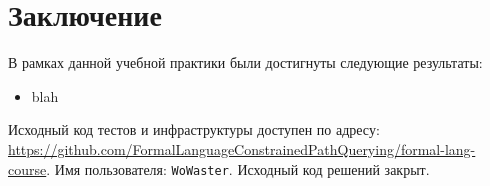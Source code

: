 
\section*{Заключение}





В рамках данной учебной практики были достигнуты следующие результаты:
\begin{itemize}
    \item blah
\end{itemize}

Исходный код тестов и инфраструктуры доступен по адресу: \url{https://github.com/FormalLanguageConstrainedPathQuerying/formal-lang-course}.
Имя пользователя: \texttt{WoWaster}.
Исходный код решений закрыт.
